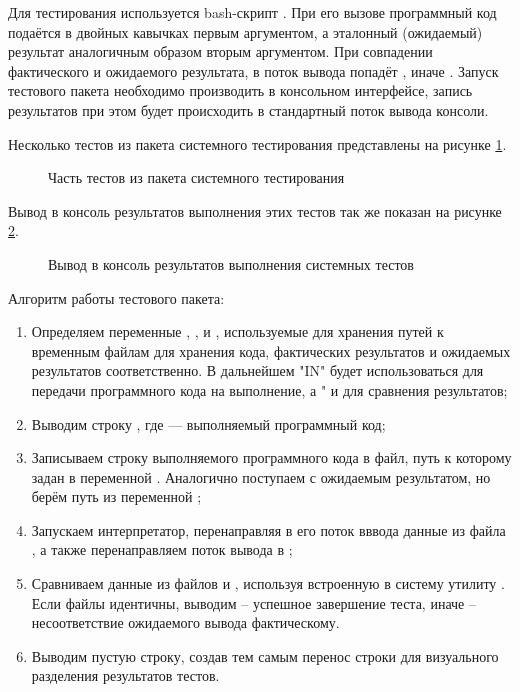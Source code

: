 Для тестирования используется bash-скрипт . При его вызове программный код подаётся в двойных кавычках первым аргументом, а эталонный (ожидаемый) результат аналогичным образом вторым аргументом. При совпадении фактического и ожидаемого результата, в поток вывода \cite{e28} попадёт , иначе . Запуск тестового пакета необходимо производить в консольном интерфейсе, запись результатов при этом будет происходить в стандартный поток вывода консоли.

Несколько тестов из пакета системного тестирования представлены на рисунке \ref{system_test_code:image}.

\begin{figure}[ht]
	\caption{Часть тестов из пакета системного тестирования}
	\label{system_test_code:image}
\end{figure}

Вывод в консоль результатов выполнения этих тестов так же показан на рисунке \ref{system_test_res:image}.

\begin{figure}[ht]
	\caption{Вывод в консоль результатов выполнения системных тестов}
	\label{system_test_res:image}
\end{figure}

Алгоритм работы тестового пакета:

\begin{enumerate}
\item Определяем переменные , , и , используемые для хранения путей к временным файлам для хранения кода, фактических результатов и ожидаемых результатов соответственно. В дальнейшем "IN" будет использоваться для передачи программного кода на выполнение, а " и  для сравнения результатов;

\item Выводим строку , где  — выполняемый программный код;

\item Записываем строку выполняемого программного кода в файл, путь к которому задан в переменной . Аналогично поступаем с ожидаемым результатом, но берём путь из переменной ;

\item Запускаем интерпретатор, перенаправляя в его поток вввода данные из файла , а также перенаправляем поток вывода в ;

\item Сравниваем данные из файлов  и , используя встроенную в систему утилиту  \cite{e24}. Если файлы идентичны, выводим  -- успешное завершение теста, иначе  -- несоответствие ожидаемого вывода фактическому.

\item Выводим пустую строку, создав тем самым перенос строки для визуального разделения результатов тестов.

\end{enumerate}

